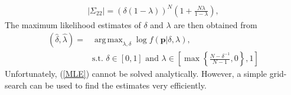 \documentclass[11pt,twoside]{article}
\DeclareMathOperator*{\argmax}{arg\,max}
\theoremstyle{definition}
\theoremstyle{definition}
\begin{document}
\begin{align*}
\left| \Sigma_{22}\right| = (\delta(1- \lambda))^N \left(1+\frac{N \lambda}{1 - \lambda} \right),
\end{align*}
The maximum likelihood estimates of $\delta$ and $\lambda$ are then obtained from
\begin{align}
(\hat{\delta}, \hat{\lambda}) =& \argmax_{\lambda, \delta} \log  f\left(\boldsymbol{p}| \delta, \lambda \right), \label{MLE}\\
& \text{s.t. } \nonumber \delta \in [0,1] \text{ and } \lambda \in \left[  \max \left\{ \frac{N-\delta^{-1}}{N-1}, 0\right\}, 1 \right]
\end{align}
Unfortunately, (\ref{MLE}) cannot be solved analytically. However, a simple grid-search can be used to find the estimates very efficiently. 







\end{document}
